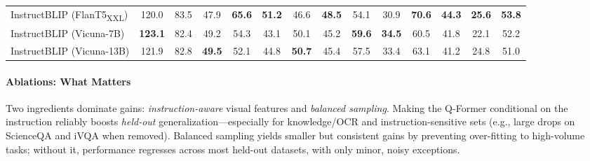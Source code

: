 \begin{enrichment}
\begin{enrichment}
\begin{table}[H]
{\begin{tabular}{l*{13}{c}}
                    InstructBLIP (FlanT5\textsubscript{XXL}) & 120.0 & 83.5 & 47.9 & \textbf{65.6} & \textbf{51.2} & 46.6 & \textbf{48.5} & 54.1 & 30.9 & \textbf{70.6} & \textbf{44.3} & \textbf{25.6} & \textbf{53.8} \\
                    InstructBLIP (Vicuna-7B) & \textbf{123.1} & 82.4 & 49.2 & 54.3 & 43.1 & 50.1 & 45.2 & \textbf{59.6} & \textbf{34.5} & 60.5 & 41.8 & 22.1 & 52.2 \\
                    InstructBLIP (Vicuna-13B) & 121.9 & 82.8 & \textbf{49.5} & 52.1 & 44.8 & \textbf{50.7} & 45.4 & 57.5 & 33.4 & 63.1 & 41.2 & 24.8 & 51.0 \\
                    \bottomrule
            \end{tabular}}
        \end{table}
        
        \paragraph{Ablations: What Matters}
        Two ingredients dominate gains: \emph{instruction-aware} visual features and \emph{balanced sampling}. Making the Q-Former conditional on the instruction reliably boosts \emph{held-out} generalization—especially for knowledge/OCR and instruction-sensitive sets (e.g., large drops on ScienceQA and iVQA when removed). Balanced sampling yields smaller but consistent gains by preventing over-fitting to high-volume tasks; without it, performance regresses across most held-out datasets, with only minor, noisy exceptions.
        

\end{enrichment}
\end{enrichment}
